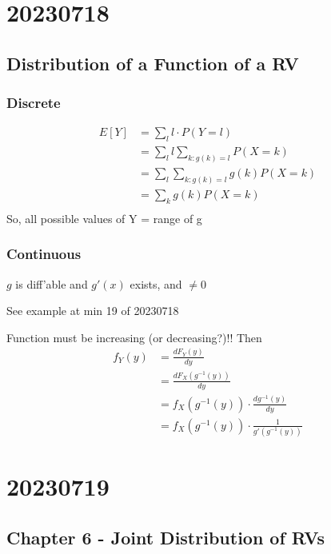 \documentclass{report}
\begin{document}
\chapter{20230718}%
  \section*{Distribution of a Function of a RV}%
  
    \subsection*{Discrete}%
    
    \begin{align*}
      E[Y] &= \sum^{}_{l} l \cdot P(Y=l)\\ 
           &= \sum^{}_{l} l \sum^{}_{k: g(k)=l} P(X=k)\\ 
           &= \sum^{}_{l} \sum^{}_{k: g(k)=l} g(k) P(X=k)\\ 
           &= \sum^{}_{k} g(k) P(X=k)\\ 
    \end{align*}
    So, all possible values of Y = range of g

    \subsection*{Continuous}%
    $g$ is diff'able and $g'(x)$ exists, and $\neq 0$


    See example at min 19 of 20230718

    Function must be increasing (or decreasing?)!!  Then
    \begin{align*}
      f_Y(y) &= \frac{d F_Y(y)}{dy} \\
             &= \frac{d F_X(g^{-1}(y))}{dy} \\
             &= f_X(g^{-1}(y)) \cdot \frac{d g^{-1}(y)}{dy}  \\
             &= f_X(g^{-1}(y)) \cdot \frac{1}{g'(g^{-1}(y))}
    \end{align*}




\chapter{20230719}%
  \section*{Chapter 6 - Joint Distribution of RVs}%
\end{document}
